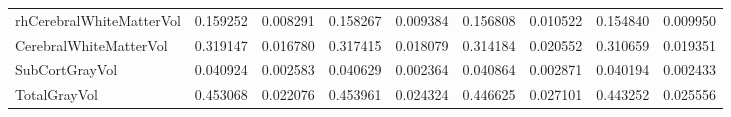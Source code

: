 \begin{table}[H]
\begin{tabular}{l|cc|cc|cc|cc}
rhCerebralWhiteMatterVol & 0.159252 & 0.008291 & 0.158267 & 0.009384 & 0.156808 & 0.010522 & 0.154840 & 0.009950 \\
CerebralWhiteMatterVol & 0.319147 & 0.016780 & 0.317415 & 0.018079 & 0.314184 & 0.020552 & 0.310659 & 0.019351 \\
SubCortGrayVol & 0.040924 & 0.002583 & 0.040629 & 0.002364 & 0.040864 & 0.002871 & 0.040194 & 0.002433 \\
TotalGrayVol & 0.453068 & 0.022076 & 0.453961 & 0.024324 & 0.446625 & 0.027101 & 0.443252 & 0.025556 \\
\hline
\end{tabular}
\label{tab:version_comparison}
\end{table}